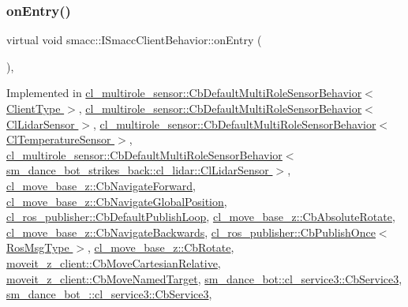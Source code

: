 \subsubsection{\texorpdfstring{on\+Entry()}{onEntry()}}
{\footnotesize\ttfamily virtual void smacc\+::\+I\+Smacc\+Client\+Behavior\+::on\+Entry (\begin{DoxyParamCaption}{ }\end{DoxyParamCaption})\hspace{0.3cm}{\ttfamily [protected]}, {}}



Implemented in \hyperlink{classcl__multirole__sensor_1_1CbDefaultMultiRoleSensorBehavior_a5ac29f93cc91e23715f51ade94467cae}{cl\+\_\+multirole\+\_\+sensor\+::\+Cb\+Default\+Multi\+Role\+Sensor\+Behavior$<$ Client\+Type $>$}, \hyperlink{classcl__multirole__sensor_1_1CbDefaultMultiRoleSensorBehavior_a5ac29f93cc91e23715f51ade94467cae}{cl\+\_\+multirole\+\_\+sensor\+::\+Cb\+Default\+Multi\+Role\+Sensor\+Behavior$<$ Cl\+Lidar\+Sensor $>$}, \hyperlink{classcl__multirole__sensor_1_1CbDefaultMultiRoleSensorBehavior_a5ac29f93cc91e23715f51ade94467cae}{cl\+\_\+multirole\+\_\+sensor\+::\+Cb\+Default\+Multi\+Role\+Sensor\+Behavior$<$ Cl\+Temperature\+Sensor $>$}, \hyperlink{classcl__multirole__sensor_1_1CbDefaultMultiRoleSensorBehavior_a5ac29f93cc91e23715f51ade94467cae}{cl\+\_\+multirole\+\_\+sensor\+::\+Cb\+Default\+Multi\+Role\+Sensor\+Behavior$<$ sm\+\_\+dance\+\_\+bot\+\_\+strikes\+\_\+back\+::cl\+\_\+lidar\+::\+Cl\+Lidar\+Sensor $>$}, \hyperlink{classcl__move__base__z_1_1CbNavigateForward_af9a2e49071de287922c3f5963a079b95}{cl\+\_\+move\+\_\+base\+\_\+z\+::\+Cb\+Navigate\+Forward}, \hyperlink{classcl__move__base__z_1_1CbNavigateGlobalPosition_a66d8b0555ef2945bc108dcd5171be292}{cl\+\_\+move\+\_\+base\+\_\+z\+::\+Cb\+Navigate\+Global\+Position}, \hyperlink{classcl__ros__publisher_1_1CbDefaultPublishLoop_a6e6cfb477cbefc510ca7b55a061545e4}{cl\+\_\+ros\+\_\+publisher\+::\+Cb\+Default\+Publish\+Loop}, \hyperlink{classcl__move__base__z_1_1CbAbsoluteRotate_a10418ea360809fa649d295716b152b2b}{cl\+\_\+move\+\_\+base\+\_\+z\+::\+Cb\+Absolute\+Rotate}, \hyperlink{classcl__move__base__z_1_1CbNavigateBackwards_a545a5282f0ef6b0080b46002d6037567}{cl\+\_\+move\+\_\+base\+\_\+z\+::\+Cb\+Navigate\+Backwards}, \hyperlink{classcl__ros__publisher_1_1CbPublishOnce_afaed71bc2694ec1837278d5f931a76e1}{cl\+\_\+ros\+\_\+publisher\+::\+Cb\+Publish\+Once$<$ Ros\+Msg\+Type $>$}, \hyperlink{classcl__move__base__z_1_1CbRotate_a316ee51ecfd3f10fd1edae0d7d3b26c0}{cl\+\_\+move\+\_\+base\+\_\+z\+::\+Cb\+Rotate}, \hyperlink{classmoveit__z__client_1_1CbMoveCartesianRelative_aaea0e6c7431f93301a77269b8fa539f8}{moveit\+\_\+z\+\_\+client\+::\+Cb\+Move\+Cartesian\+Relative}, \hyperlink{classmoveit__z__client_1_1CbMoveNamedTarget_ad84bcf4ea514c0cdc3550ca41ff77d69}{moveit\+\_\+z\+\_\+client\+::\+Cb\+Move\+Named\+Target}, \hyperlink{classsm__dance__bot_1_1cl__service3_1_1CbService3_ae9e3796b507ad96cc0890fec0f64a4b7}{sm\+\_\+dance\+\_\+bot\+::cl\+\_\+service3\+::\+Cb\+Service3}, \hyperlink{classsm__dance__bot__2_1_1cl__service3_1_1CbService3_a179e43cc240f53f9c49c67094e41d75f}{sm\+\_\+dance\+\_\+bot\+\_\+::cl\+\_\+service3\+::\+Cb\+Service3}, 
